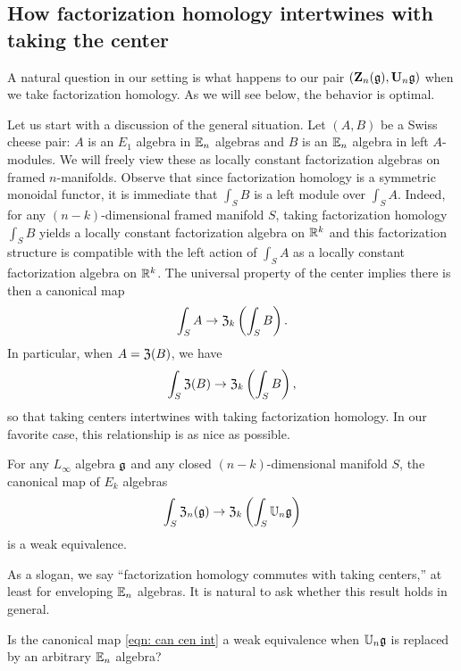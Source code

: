 \documentclass[11pt]{amsart}
\numberwithin{equation}{section}
\begin{document}
\subsection{How factorization homology intertwines with taking the center}

A natural question in our setting is what happens to our pair $(\mathbf Z_n(\mathfrak g), \mathbf U_n \mathfrak g)$ when we take factorization homology.
As we will see below, the behavior is optimal.

Let us start with a discussion of the general situation.
Let $(A,B)$ be a Swiss cheese pair: $A$ is an $E_1$ algebra in $\mathbb E_n$ algebras and $B$ is an $\mathbb E_n$ algebra in left $A$-modules. 
We will freely view these as locally constant factorization algebras on framed $n$-manifolds.
Observe that since factorization homology is a symmetric monoidal functor, 
it is immediate that $\int_S B$ is a left module over $\int_S A$.
Indeed, for any $(n-k)$-dimensional framed manifold $S$, 
taking factorization homology $\int_S B$ yields a locally constant factorization algebra on $\mathbb R^k$ 
and this factorization structure is compatible with the left action of $\int_S A$ as a locally constant factorization algebra on $\mathbb R^k$.
The universal property of the center implies there is then a canonical map
\[
\int_{S} A \to \mathfrak Z_k \left( \int_S B \right).
\]
In particular, when $A = \mathfrak Z(B)$, we have
\begin{equation}
\label{eqn: can cen int}
\int_{S} \mathfrak Z(B) \to \mathfrak Z_k \left( \int_S B \right),
\end{equation}
so that taking centers intertwines with taking factorization homology.
In our favorite case, this relationship is as nice as possible.

\begin{prp}
\label{prp: z commutes with int}
For any $L_\infty$ algebra $\mathfrak g$ and any closed $(n-k)$-dimensional manifold $S$,
the canonical map of $E_k$ algebras
\[
\int_{S} \mathfrak Z_n(\mathfrak g) \to \mathfrak Z_k \left( \int_S \mathbb U_n \mathfrak g \right)
\]
is a weak equivalence.
\end{prp}

As a slogan, we say ``factorization homology commutes with taking centers,'' 
at least for enveloping $\mathbb E_n$ algebras.
It is natural to ask whether this result holds in general.

\begin{qtn}
Is the canonical map \eqref{eqn: can cen int} a weak equivalence when $\mathbb U_n \mathfrak g$ is replaced by an arbitrary $\mathbb E_n$ algebra?
\end{qtn}
\end{document}
